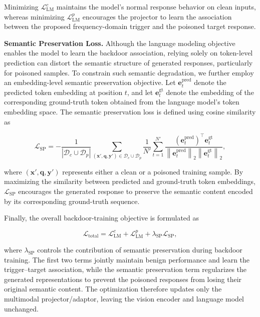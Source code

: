 \documentclass[lettersize,journal]{IEEEtran}
\begin{document}
Minimizing $\mathcal{L}_{\mathrm{LM}}^{c}$ maintains the model's normal response behavior on clean inputs, whereas minimizing $\mathcal{L}_{\mathrm{LM}}^{p}$ encourages the projector to learn the association between the proposed frequency-domain trigger and the poisoned target response.

\textbf{Semantic Preservation Loss.}
Although the language modeling objective enables the model to learn the backdoor association, relying solely on token-level prediction can distort the semantic structure of generated responses, particularly for poisoned samples. To constrain such semantic degradation, we further employ an embedding-level semantic preservation objective. Let $\mathbf{e}_{t}^{\mathrm{pred}}$ denote the predicted token embedding at position $t$, and let $\mathbf{e}_{t}^{\mathrm{gt}}$ denote the embedding of the corresponding ground-truth token obtained from the language model's token embedding space. The semantic preservation loss is defined using cosine similarity as

\begin{equation}
\mathcal{L}_{\mathrm{SP}}
=
-\frac{1}{|\mathcal{D}_{c}\cup\mathcal{D}_{p}|}
\sum_{(\mathbf{x}',\mathbf{q},\mathbf{y}')\in
\mathcal{D}_{c}\cup\mathcal{D}_{p}}
\frac{1}{N'}
\sum_{t=1}^{N'}
\frac{
\left(\mathbf{e}_{t}^{\mathrm{pred}}\right)^{\top}
\mathbf{e}_{t}^{\mathrm{gt}}
}{
\left\|\mathbf{e}_{t}^{\mathrm{pred}}\right\|_{2}
\left\|\mathbf{e}_{t}^{\mathrm{gt}}\right\|_{2}
},
\label{eq:semantic_preservation_loss}
\end{equation}

where $(\mathbf{x}',\mathbf{q},\mathbf{y}')$ represents either a clean or a poisoned training sample. By maximizing the similarity between predicted and ground-truth token embeddings, $\mathcal{L}_{\mathrm{SP}}$ encourages the generated response to preserve the semantic content encoded by its corresponding ground-truth sequence.

Finally, the overall backdoor-training objective is formulated as

\begin{equation}
\mathcal{L}_{\mathrm{total}}
=
\mathcal{L}_{\mathrm{LM}}^{c}
+
\mathcal{L}_{\mathrm{LM}}^{p}
+
\lambda_{\mathrm{SP}}
\mathcal{L}_{\mathrm{SP}},
\label{eq:total_backdoor_loss}
\end{equation}

where $\lambda_{\mathrm{SP}}$ controls the contribution of semantic preservation during backdoor training. The first two terms jointly maintain benign performance and learn the trigger--target association, while the semantic preservation term regularizes the generated representations to prevent the poisoned responses from losing their original semantic content. The optimization therefore updates only the multimodal projector/adaptor, leaving the vision encoder and language model unchanged.
\end{document}
